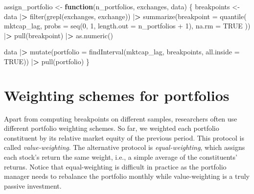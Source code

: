\documentclass[
]{book}
\newenvironment{Shaded}{\begin{snugshade}}{\end{snugshade}}
\newcommand{\AttributeTok}[1]{\textcolor[rgb]{0.61,0.61,0.61}{#1}}
\newcommand{\ConstantTok}[1]{\textcolor[rgb]{0,0,0}{#1}}
\newcommand{\ControlFlowTok}[1]{\textcolor[rgb]{0.27,0.27,0.27}{\textbf{#1}}}
\newcommand{\DecValTok}[1]{\textcolor[rgb]{0.06,0.06,0.06}{#1}}
\newcommand{\ErrorTok}[1]{\textcolor[rgb]{0.14,0.14,0.14}{\textbf{#1}}}
\newcommand{\FunctionTok}[1]{\textcolor[rgb]{0,0,0}{#1}}
\newcommand{\NormalTok}[1]{#1}
\newcommand{\OtherTok}[1]{\textcolor[rgb]{0.37,0.37,0.37}{#1}}
\newcommand{\SpecialCharTok}[1]{\textcolor[rgb]{0,0,0}{#1}}
\begin{document}
\begin{Shaded}
\begin{Highlighting}[]
\NormalTok{assign\_portfolio }\OtherTok{\textless{}{-}} \ControlFlowTok{function}\NormalTok{(n\_portfolios,}
\NormalTok{                             exchanges,}
\NormalTok{                             data) \{}
\NormalTok{  breakpoints }\OtherTok{\textless{}{-}}\NormalTok{ data }\SpecialCharTok{|}\ErrorTok{\textgreater{}}
    \FunctionTok{filter}\NormalTok{(}\FunctionTok{grepl}\NormalTok{(exchanges, exchange)) }\SpecialCharTok{|}\ErrorTok{\textgreater{}}
    \FunctionTok{summarize}\NormalTok{(}\AttributeTok{breakpoint =} \FunctionTok{quantile}\NormalTok{(}
\NormalTok{      mktcap\_lag,}
      \AttributeTok{probs =} \FunctionTok{seq}\NormalTok{(}\DecValTok{0}\NormalTok{, }\DecValTok{1}\NormalTok{, }\AttributeTok{length.out =}\NormalTok{ n\_portfolios }\SpecialCharTok{+} \DecValTok{1}\NormalTok{),}
      \AttributeTok{na.rm =} \ConstantTok{TRUE}
\NormalTok{    )) }\SpecialCharTok{|}\ErrorTok{\textgreater{}}
    \FunctionTok{pull}\NormalTok{(breakpoint) }\SpecialCharTok{|}\ErrorTok{\textgreater{}}
    \FunctionTok{as.numeric}\NormalTok{()}

\NormalTok{  data }\SpecialCharTok{|}\ErrorTok{\textgreater{}}
    \FunctionTok{mutate}\NormalTok{(}\AttributeTok{portfolio =} \FunctionTok{findInterval}\NormalTok{(mktcap\_lag, }
\NormalTok{                                    breakpoints, }\AttributeTok{all.inside =} \ConstantTok{TRUE}\NormalTok{)) }\SpecialCharTok{|}\ErrorTok{\textgreater{}}
    \FunctionTok{pull}\NormalTok{(portfolio)}
\NormalTok{\}}
\end{Highlighting}
\end{Shaded}

\hypertarget{weighting-schemes-for-portfolios}{%
\section{Weighting schemes for portfolios}\label{weighting-schemes-for-portfolios}}

Apart from computing breakpoints on different samples, researchers often use different portfolio weighting schemes. So far, we weighted each portfolio constituent by its relative market equity of the previous period. This protocol is called \emph{value-weighting}. The alternative protocol is \emph{equal-weighting}, which assigns each stock's return the same weight, i.e., a simple average of the constituents' returns. Notice that equal-weighting is difficult in practice as the portfolio manager needs to rebalance the portfolio monthly while value-weighting is a truly passive investment.
\end{document}
